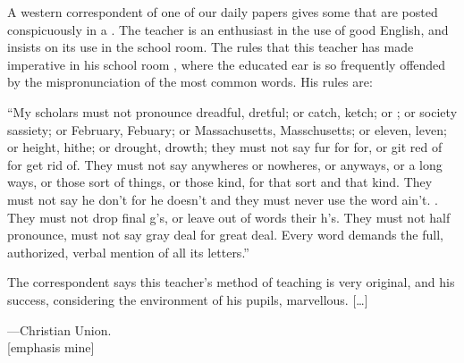 \begin{ipquote}
\begin{center}
\end{center}
A western correspondent of one of our daily papers gives some  that are posted conspicuously in a . The teacher is an enthusiast in the use of good English, and insists on its use in the school room. The rules that this teacher has made imperative in his school room , where the educated ear is so frequently offended by the mispronunciation of the most common words. His rules are:

“My scholars must not pronounce dreadful, dretful; or catch, ketch; or ; or society sassiety; or February, Febuary; or Massachusetts, Masschusetts; or eleven, leven; or height, hithe; or drought, drowth; they must not say fur for for, or git red of for get rid of. They must not say anywheres or nowheres, or anyways, or a long ways, or those sort of things, or those kind, for that sort and that kind. They must not say he don’t for he do{\kern0pt}esn’t and they must never use the word ain’t. . They must not drop final g’s, or leave out of words their h’s. They must not half pronounce, must not say gray deal for great deal. Every word demands the full, authorized, verbal mention of all its letters.”

{The correspondent says this teacher’s method of teaching is very original, and his success, considering the environment of his pupils, marvellous. {[…]}

\raggedleft
—Christian Union.\\
{[emphasis mine]}\\}
\end{ipquote}

